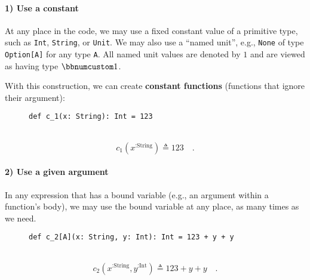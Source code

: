 \paragraph{1) Use a constant}

At any place in the code, we may use a fixed constant value of a primitive
type, such as \lstinline!Int!, \lstinline!String!, or \lstinline!Unit!.
We may also use a \textsf{``}named unit\textsf{''}, e.g.,
\lstinline!None! of type \lstinline!Option[A]! for any type \lstinline!A!.
All named unit values are denoted by $1$ and are viewed as having
type $\bbnum 1$. 

With this construction, we can create \textbf{constant
functions} (functions that ignore their argument):

\begin{wrapfigure}{l}{0.5\columnwidth}%
\vspace{-0.65\baselineskip}
\begin{lstlisting}
def c_1(x: String): Int = 123
\end{lstlisting}

\vspace{-0.25\baselineskip}
\end{wrapfigure}%

~\vspace{-0.35\baselineskip}
\[
c_{1}(x^{:\text{String}})\triangleq123\quad.
\]
\vspace{-0.85\baselineskip}


\paragraph{2) Use a given argument}

In any expression that has a bound variable (e.g., an argument within
a function\textsf{'}s body), we may use the bound variable at any place, as
many times as we need.

\begin{wrapfigure}{l}{0.5\columnwidth}%
\vspace{-0.65\baselineskip}
\begin{lstlisting}
def c_2[A](x: String, y: Int): Int = 123 + y + y
\end{lstlisting}

\vspace{-0.25\baselineskip}
\end{wrapfigure}%

~\vspace{-0.35\baselineskip}
\[
c_{2}(x^{:\text{String}},y^{:\text{Int}})\triangleq123+y+y\quad.
\]
\vspace{-0.85\baselineskip}



